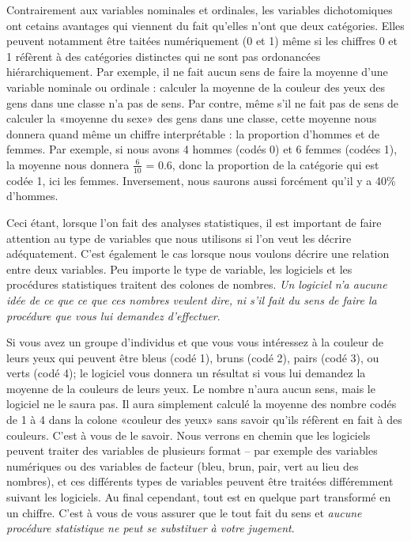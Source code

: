\documentclass[
]{book}
\begin{document}
Contrairement aux variables nominales et ordinales, les variables dichotomiques ont cetains avantages qui viennent du fait qu'elles n'ont que deux catégories. Elles peuvent notamment être taitées numériquement (0 et 1) même si les chiffres 0 et 1 réfèrent à des catégories distinctes qui ne sont pas ordonancées hiérarchiquement. Par exemple, il ne fait aucun sens de faire la moyenne d'une variable nominale ou ordinale : calculer la moyenne de la couleur des yeux des gens dans une classe n'a pas de sens. Par contre, même s'il ne fait pas de sens de calculer la «moyenne du sexe» des gens dans une classe, cette moyenne nous donnera quand même un chiffre interprétable : la proportion d'hommes et de femmes. Par exemple, si nous avons 4 hommes (codés 0) et 6 femmes (codées 1), la moyenne nous donnera \(\frac{6}{10}\) = 0.6, donc la proportion de la catégorie qui est codée 1, ici les femmes. Inversement, nous saurons aussi forcément qu'il y a 40\% d'hommes.

Ceci étant, lorsque l'on fait des analyses statistiques, il est important de faire attention au type de variables que nous utilisons si l'on veut les décrire adéquatement. C'est également le cas lorsque nous voulons décrire une relation entre deux variables. Peu importe le type de variable, les logiciels et les procédures statistiques traitent des colones de nombres. \emph{Un logiciel n'a aucune idée de ce que ce que ces nombres veulent dire, ni s'il fait du sens de faire la procédure que vous lui demandez d'effectuer}.

Si vous avez un groupe d'individus et que vous vous intéressez à la couleur de leurs yeux qui peuvent être bleus (codé 1), bruns (codé 2), pairs (codé 3), ou verts (codé 4); le logiciel vous donnera un résultat si vous lui demandez la moyenne de la couleurs de leurs yeux. Le nombre n'aura aucun sens, mais le logiciel ne le saura pas. Il aura simplement calculé la moyenne des nombre codés de 1 à 4 dans la colone «couleur des yeux» sans savoir qu'ils réfèrent en fait à des couleurs. C'est à vous de le savoir. Nous verrons en chemin que les logiciels peuvent traiter des variables de plusieurs format -- par exemple des variables numériques ou des variables de facteur (bleu, brun, pair, vert au lieu des nombres), et ces différents types de variables peuvent être traitées différemment suivant les logiciels. Au final cependant, tout est en quelque part transformé en un chiffre. C'est à vous de vous assurer que le tout fait du sens et \emph{aucune procédure statistique ne peut se substituer à votre jugement}.
\end{document}
